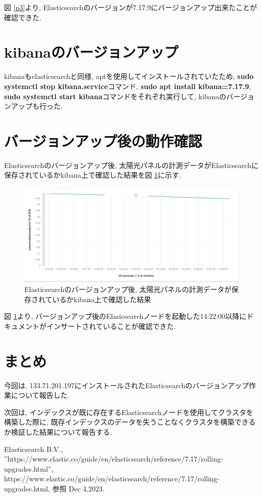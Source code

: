 \documentclass[a4j,12pt,]{jarticle}
\begin{document}
図 \ref{p3}より, Elasticsearchのバージョンが7.17.9にバージョンアップ出来たことが確認できた.

\section{kibanaのバージョンアップ}

kibanaもelasticsearchと同様, aptを使用してインストールされていたため, \textbf{sudo systemctl stop kibana.service}コマンド, \textbf{sudo apt install kibana=7.17.9}, \textbf{sudo systemctl start kibana}コマンドをそれぞれ実行して, kibanaのバージョンアップも行った.

\section{バージョンアップ後の動作確認}

Elasticsearchのバージョンアップ後, 太陽光パネルの計測データがElasticsearchに保存されているかkibana上で確認した結果を図 \ref{p4}に示す.

\begin{figure}[H]
  \begin{center}
    \includegraphics[width=160mm]{downtime.png}
    \caption{Elasticsearchのバージョンアップ後, 太陽光パネルの計測データが保存されているかkibana上で確認した結果}
    \label{p4}
  \end{center}
\end{figure}

図 \ref{p4}より, バージョンアップ後のElasicsearchノードを起動した14:22:00以降にドキュメントがインサートされていることが確認できた.

\section{まとめ}
今回は, 133.71.201.197にインストールされたElasticsearchのバージョンアップ作業について報告した.

次回は, インデックスが既に存在するElasticsearchノードを使用してクラスタを構築した際に, 既存インデックスのデータを失うことなくクラスタを構築できるか検証した結果について報告する.

\begin{thebibliography}{5}
  Elasticsearch B.V.,\\ ”https://www.elastic.co/guide/en/elasticsearch/reference/7.17/rolling-upgrades.html”, https://www.elastic.co/guide/en/elasticsearch/reference/7.17/rolling-upgrades.html, 参照 Dec 4,2023.
\end{thebibliography}
\end{document}
